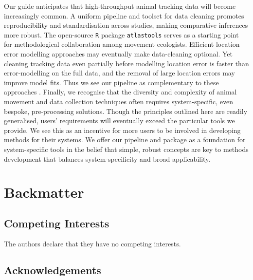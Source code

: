 \documentclass[10pt,paper=a4,headings=standardclasses
]{scrartcl}
\begin{document}
Our guide anticipates that high-throughput animal tracking data will become increasingly common.
A uniform pipeline and toolset for data cleaning promotes reproducibility and standardisation across studies, making comparative inferences more robust.
The open-source \texttt{R} package \texttt{atlastools} serves as a starting point for methodological collaboration among movement ecologists.
Efficient location error modelling approaches \citep{fleming2020, aspillaga2021} may eventually make data-cleaning optional.
Yet cleaning tracking data even partially before modelling location error is faster than error-modelling on the full data, and the removal of large location errors may improve model fits.
Thus we see our pipeline as complementary to these approaches \citep{fleming2014a, fleming2020}.
Finally, we recognise that the diversity and complexity of animal movement and data collection techniques often requires system-specific, even bespoke, pre-processing solutions.
Though the principles outlined here are readily generalised, users' requirements will eventually exceed the particular tools we provide.
We see this as an incentive for more users to be involved in developing methods for their systems.
We offer our pipeline and package as a foundation for system-specific tools in the belief that simple, robust concepts are key to methods development that balances system-specificity and broad applicability.

\section{Backmatter}

\subsection{Competing Interests}

The authors declare that they have no competing interests.

\subsection{Acknowledgements}
\end{document}
